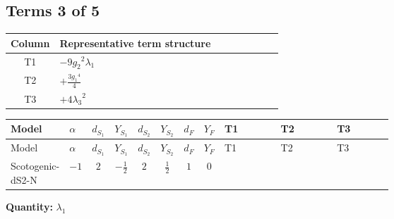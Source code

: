 \documentclass[8pt]{article}
\begin{document}
\begin{landscape}
\subsection*{Terms 3 of 5}
\begin{center}
\begin{tabular}{@{}c >{\raggedright\arraybackslash}p{0.82\linewidth}@{}}
\toprule
Column & Representative term structure \\
\midrule
T1 & \(\displaystyle -9 {g_2}^2 {\lambda_1}\) \\
\midrule
T2 & \(\displaystyle +\frac{3 {g_1}^4}{4}\) \\
\midrule
T3 & \(\displaystyle +4 {\lambda_3}^2\) \\
\midrule
\bottomrule
\end{tabular}
\end{center}
\smallskip
\tiny
\begin{longtable}{@{}llcccccc >{\raggedright\arraybackslash}p{0.21\linewidth} >{\raggedright\arraybackslash}p{0.21\linewidth} >{\raggedright\arraybackslash}p{0.21\linewidth}@{}}
\toprule
Model & $\alpha$ & $d_{S_1}$ & $Y_{S_1}$ & $d_{S_2}$ & $Y_{S_2}$ & $d_F$ & $Y_F$ & T1 & T2 & T3 \\
\midrule
\endfirsthead
\toprule
Model & $\alpha$ & $d_{S_1}$ & $Y_{S_1}$ & $d_{S_2}$ & $Y_{S_2}$ & $d_F$ & $Y_F$ & T1 & T2 & T3 \\
\midrule
\endhead
Scotogenic-dS2-N & $-1$ & $2$ & $-\frac{1}{2}$ & $2$ & $\frac{1}{2}$ & $1$ & $0$ & \scriptsize\adjustbox{max width=\linewidth}{$\begin{gathered} -9 {g_2}^2 {\lambda_1}\end{gathered}$} & \scriptsize\adjustbox{max width=\linewidth}{$\begin{gathered} +\frac{3 {g_1}^4}{4}\end{gathered}$} & \scriptsize\adjustbox{max width=\linewidth}{$\begin{gathered} +4 {\lambda_3}^2\end{gathered}$} \\
\midrule
\bottomrule
\end{longtable}
\clearpage
\noindent\textbf{Quantity: }$\lambda_1$\par\smallskip

\end{landscape}
\end{document}

